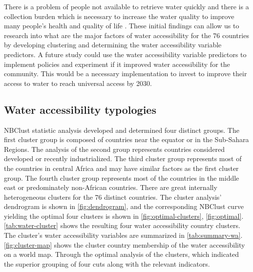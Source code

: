 \documentclass[10pt,twoside]{article}
\numberwithin{equation}{section}
\newcommand{\?}{\stackrel{?}{=}}
\begin{document}
There is a problem of people not available to retrieve water quickly and there is a collection burden which is necessary to increase the water quality to improve many people's health and quality of life \citep{cassivi2018access}. These initial findings can allow us to research into what are the major factors of water accessibility for the 76 countries by developing clustering and determining the water accessibility variable predictors. A future study could use the water accessibility variable predictors to implement policies and experiment if it improved water accessibility for the community. This would be a necessary implementation to invest to improve their access to water to reach universal access by 2030.



\subsection{Water accessibility typologies}

NBClust statistic analysis developed and determined four distinct groups. The first cluster group is composed of countries near the equator or in the Sub-Sahara Regions. The analysis of the second group represents countries considered developed or recently industrialized. The third cluster group represents most of the countries in central Africa and may have similar factors as the first cluster group. The fourth cluster group represents most of the countries in the middle east or predominately non-African countries. There are great internally heterogeneous clusters for the 76 distinct countries. The cluster analysis' dendrogram is shown in \autoref{fig:dendrogram}, and the corresponding NBClust curve yielding the optimal four clusters is shown in \autoref{fig:optimal-clusters}, \autoref{fig:optimal}. \autoref{tab:water-cluster} shows the resulting four water accessibility country clusters. The cluster's water accessibility variables are summarized in \autoref{tab:summary-wa}. \autoref{fig:cluster-map} shows the cluster country membership of the water accessibility on a world map.  Through the optimal analysis of the clusters, which indicated the superior grouping of four cuts along with the relevant indicators. 
\end{document}
